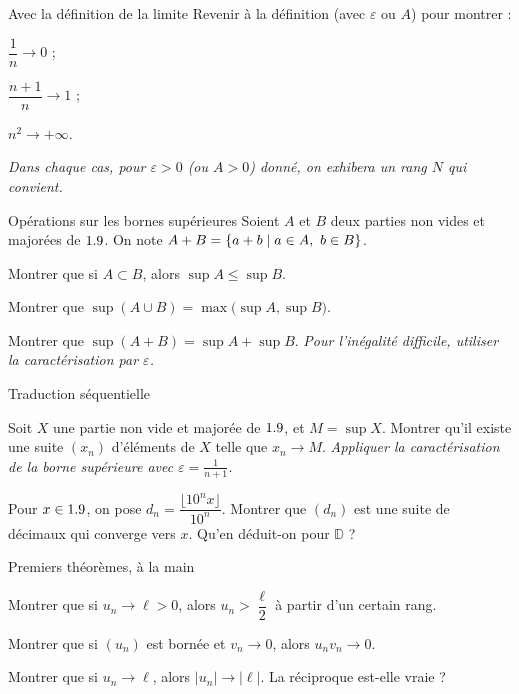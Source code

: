 \begin{exercice}[1]{Avec la définition de la limite}
Revenir à la définition (avec $\varepsilon$ ou $A$) pour montrer :
\begin{questions}
  \item $\dfrac1n\longrightarrow0$ ;
  \item $\dfrac{n+1}{n}\longrightarrow1$ ;
  \item $n^{2}\longrightarrow+\infty$.
\end{questions}
\emph{Dans chaque cas, pour $\varepsilon>0$ (ou $A>0$) donné, on exhibera un
rang $N$ qui convient.}
\end{exercice}


\begin{exercice}[2]{Opérations sur les bornes supérieures}
Soient $A$ et $B$ deux parties non vides et majorées de $1.9$. On note
$A+B=\left\{a+b \mid a\in A,\ b\in B\right\}$.
\begin{questions}
  \item Montrer que si $A\subset B$, alors $\sup A\leq\sup B$.
  \item Montrer que $\sup(A\cup B)=\max\bigl(\sup A,\sup B\bigr)$.
  \item Montrer que $\sup(A+B)=\sup A+\sup B$.
    \emph{Pour l'inégalité difficile, utiliser la caractérisation par
    $\varepsilon$.}
\end{questions}
\end{exercice}

\begin{exercice}[2]{Traduction séquentielle}
\begin{questions}
  \item Soit $X$ une partie non vide et majorée de $1.9$, et $M=\sup X$.
    Montrer qu'il existe une suite $(x_n)$ d'éléments de $X$ telle que
    $x_n\to M$.
    \emph{Appliquer la caractérisation de la borne supérieure avec
    $\varepsilon=\frac{1}{n+1}$.}
  \item Pour $x\in1.9$, on pose $d_n=\dfrac{\lfloor10^{n}x\rfloor}{10^{n}}$.
    Montrer que $(d_n)$ est une suite de décimaux qui converge vers $x$.
    Qu'en déduit-on pour $\mathbb{D}$ ?
\end{questions}
\end{exercice}

\begin{exercice}[2]{Premiers théorèmes, à la main}
\begin{questions}
  \item Montrer que si $u_n\to\ell>0$, alors $u_n>\dfrac{\ell}{2}$ à partir
    d'un certain rang.
  \item Montrer que si $(u_n)$ est bornée et $v_n\to0$, alors
    $u_n v_n\to0$.
  \item Montrer que si $u_n\to\ell$, alors $|u_n|\to|\ell|$. La réciproque
    est-elle vraie ?
\end{questions}
\end{exercice}

